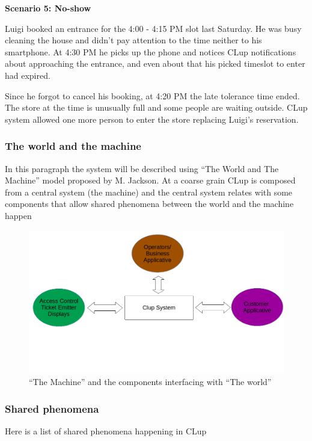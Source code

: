 \medskip

\textbf{Scenario 5: No-show}

Luigi booked an entrance for the 4:00 - 4:15 PM slot last Saturday. He was busy cleaning the house and didn't pay attention to the time neither to his smartphone. At 4:30 PM he picks up the phone and notices CLup notifications about approaching the entrance, and even about that his picked timeslot to enter had expired.

\smallskip

Since he forgot to cancel his booking, at 4:20 PM the late tolerance time ended. The store at the time is unusually full and some people are waiting outside. CLup system allowed one more person to enter the store replacing Luigi's reservation.

\medskip


\subsubsection{The world and the machine}
In this paragraph the system will be described using ``The World and The Machine'' model proposed by M. Jackson.
At a coarse grain CLup is composed from a central system (the machine) and the central system relates with some components that allow shared phenomena between the world and the machine happen
\begin{figure}
    \centering
    \includegraphics[width=\textwidth]{Images/system.png}
    \caption{\label{fig:Coarse_Grain_System}``The Machine'' and the components interfacing with ``The world''}
\end{figure}

\vfill

\subsubsection{Shared phenomena}
Here is a list of shared phenomena happening in CLup

